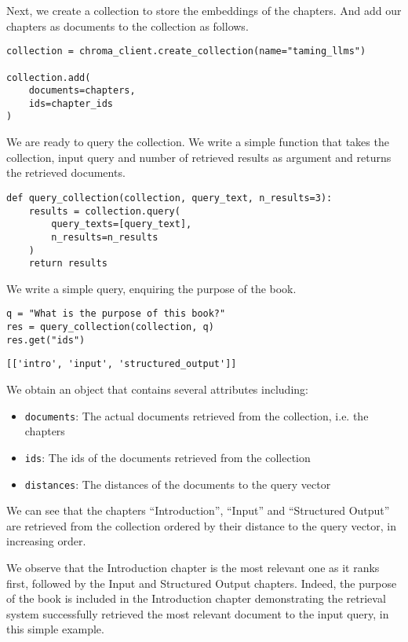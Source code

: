 Next, we create a collection to store the embeddings of the chapters. And add our chapters as documents to the collection as follows.

\begin{verbatim}
collection = chroma_client.create_collection(name="taming_llms")

collection.add(
    documents=chapters,
    ids=chapter_ids
)
\end{verbatim}

We are ready to query the collection. We write a simple function that takes the collection, input query and number of retrieved results as argument and returns the retrieved documents.

\begin{verbatim}
def query_collection(collection, query_text, n_results=3):
    results = collection.query(
        query_texts=[query_text],
        n_results=n_results
    )
    return results
\end{verbatim}
We write a simple query, enquiring the purpose of the book.

\begin{verbatim}
q = "What is the purpose of this book?"
res = query_collection(collection, q)
res.get("ids")
\end{verbatim}

\begin{verbatim}
[['intro', 'input', 'structured_output']]
\end{verbatim}

We obtain an object that contains several attributes including:
\begin{itemize}
    \item \texttt{documents}: The actual documents retrieved from the collection, i.e. the chapters 
    \item \texttt{ids}: The ids of the documents retrieved from the collection
    \item \texttt{distances}: The distances of the documents to the query vector
\end{itemize}

We can see that the chapters ``Introduction'', ``Input'' and ``Structured Output'' are retrieved from the collection ordered by their distance to the query vector, in increasing order.

We observe that the Introduction chapter is the most relevant one as it ranks first, followed by the Input and Structured Output chapters. Indeed, the purpose of the book is included in the Introduction chapter demonstrating the retrieval system successfully retrieved the most relevant document to the input query, in this simple example.

